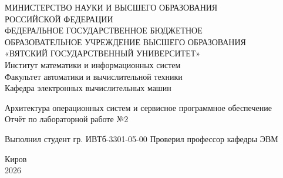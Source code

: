 \documentclass[oneside,a4paper,14pt]{extarticle}
\begin{document}
\newpage\thispagestyle{empty}
\begin{center}
	МИНИСТЕРСТВО НАУКИ И ВЫСШЕГО ОБРАЗОВАНИЯ\\
	РОССИЙСКОЙ ФЕДЕРАЦИИ\\
	ФЕДЕРАЛЬНОЕ ГОСУДАРСТВЕННОЕ БЮДЖЕТНОЕ\\
	ОБРАЗОВАТЕЛЬНОЕ УЧРЕЖДЕНИЕ ВЫСШЕГО ОБРАЗОВАНИЯ\\
	«ВЯТСКИЙ ГОСУДАРСТВЕННЫЙ УНИВЕРСИТЕТ»\\
	Институт математики и информационных систем\\
	Факультет автоматики и вычислительной техники\\
	Кафедра электронных вычислительных машин
\end{center}
\vspace{20mm}
\begin{center}
	Архитектура операционных систем и сервисное программное обеспечение\\
	Отчёт по лабораторной работе №2\\
\end{center}
\vfill
Выполнил студент гр. ИВТб-3301-05-00 \hfill
{}
Проверил профессор кафедры ЭВМ\hfill
{}
\vfill
\begin{center}
	Киров\\
	2026
\end{center}
\end{document}
